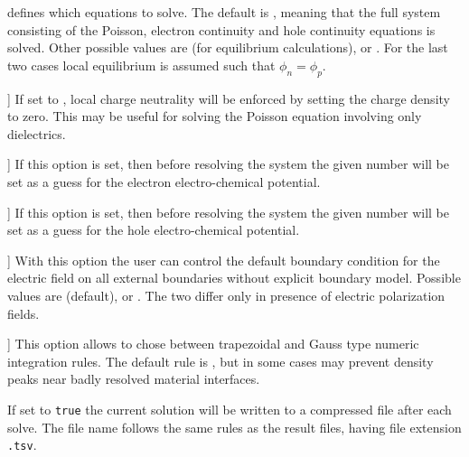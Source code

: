 \begin{description}

\item[] defines which equations to solve. The default is , meaning that the full system consisting of the Poisson, electron continuity and hole continuity equations is solved. Other possible values are  (for equilibrium calculations),  or . For the last two cases local equilibrium is assumed such that $\phi_n = \phi_p$.


\item{}] If set to , local charge neutrality will be enforced by setting the charge density to zero. This may be useful for solving the Poisson equation involving only dielectrics.

\item{}] If this option is set, then before resolving the system the given number will be set as a guess for the electron electro-chemical potential.

\item{}] If this option is set, then before resolving the system the given number will be set as a guess for the hole electro-chemical potential.

\item{}] With this option the user can control the default boundary condition for the electric field on all external boundaries without explicit boundary model. Possible values are  (default), or . The two differ only in presence of electric polarization fields.

\item{}] This option allows to chose between trapezoidal and Gauss type numeric integration rules. The default rule is , but in some cases  may prevent density peaks near badly resolved material interfaces.

\item[\keyword{save\_state = }\Value{boolean}] If set to \texttt{true} the current solution will be written to a compressed file after each solve. The file name follows the same rules as the result files, having file extension \texttt{.tsv}.


\end{description}
